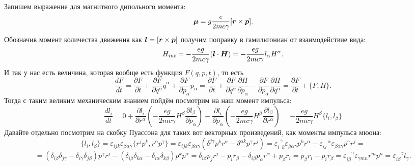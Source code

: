 
Запишем выражение для магнитного дипольного момента:
\begin{equation*}
    \mbox{\boldmath $\mu$} = g \frac{e}{2 m c \gamma} [\mbox{\boldmath $r$}\times \mbox{\boldmath $p$}].
\end{equation*}
Обозначив момент количества движения как $\mbox{\boldmath $l$} = [\mbox{\boldmath $r$}\times \mbox{\boldmath $p$}]$ получим поправку в гамильтониан от взаимодействие вида:
\begin{equation*}
    H_{int} = - \frac{e g}{2 m c \gamma} (\mbox{\boldmath $l$} \cdot \mbox{\boldmath $H$}) = - \frac{e g}{2 m c \gamma} l_\alpha H^\alpha.
\end{equation*}
И так у нас есть величина, которая вообще есть функция $F(q,p,t)$, то есть
\begin{equation*}
    \frac{d F}{d t} = \frac{\partial F}{\partial t} + \frac{\partial F}{\partial q^\alpha} \dot{q}^\alpha + \frac{\partial F}{\partial p_\alpha} \dot{p}_\alpha
    =
    \frac{\partial F}{\partial t} + \frac{\partial F}{\partial q^\alpha} \frac{\partial H}{\partial p_\alpha} - \frac{\partial F}{\partial p_\alpha} \frac{\partial H}{\partial q^\alpha} = \frac{\partial F}{\partial t} + \{F, H\}.
\end{equation*}
Тогда с таким великим механическим знанием пойдём посмотрим на наш момент импульса:
\begin{equation*}
    \frac{d l_i}{d t} = 0 + \frac{\partial l_i}{\partial r^\alpha} \left(- \frac{e g}{2 m c \gamma} H^\beta \frac{\partial l_\beta}{\partial p_\alpha}\right) - \frac{\partial l_i}{\partial p_\alpha} \left(- \frac{e g}{2 m c \gamma} H^\beta \frac{\partial l_\beta}{\partial r^\alpha}\right)
    = - \frac{e g}{2 m c \gamma} H^\beta \{l_i, l_\beta\}
\end{equation*}
Давайте отдельно посмотрим на скобку Пуассона для таких вот векторных произведений, как моменты импульса мюона:
\begin{equation*}
    \{l_i, l_\beta\} = \varepsilon_{i j k} \varepsilon_{\beta\alpha\gamma} \{r^j p^k, r^\alpha p^\gamma\} 
    =
    \varepsilon_{i j k} \varepsilon_{\beta\alpha\gamma} (\delta^{j \gamma} p^k r^\alpha - \delta^{\alpha k} p^\gamma r^j) 
    = 
    \varepsilon_{i \phantom{0} k}^{\phantom{0} \gamma} \varepsilon_{\beta\alpha\gamma} p^k r^\alpha - \varepsilon_{i j}^{\phantom{0} \phantom{0}\alpha} \varepsilon_{\beta\alpha\gamma} p^\gamma r^j
    =
\end{equation*}
\begin{equation*}
    = (\delta_{i \beta} \delta_{j \gamma} - \delta_{i \gamma} \delta_{j \beta}) p^\gamma r^j - (\delta_{i \beta} \delta_{k \alpha} - \delta_{i \alpha} \delta_{k \beta})p^k p^\alpha
    =
    \delta_{i \beta} p_j r^j - p_i r_\beta - \delta_{i \beta} p_\alpha r^\alpha + p_\beta r_i 
    =
    p_\beta r_i -p_i r_\beta = \varepsilon_{i \beta}^{\phantom{0}\phantom{0}\gamma} \varepsilon_{\gamma m n} r^m p^n = \varepsilon_{i \beta}^{\phantom{0}\phantom{0}\gamma}  l_\gamma.
\end{equation*}
